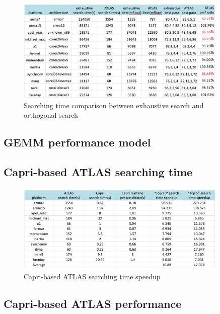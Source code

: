   \begin{figure}[tbhp]
    \centering
    \includegraphics[width=0.9\textwidth]{images/exhaustiveVsorthogonal.png}
    \caption{Searching time comparison between exhaustive search and \atl orthogonal search}
    \label{fig:exhaustiveVsorthogonal}
  \end{figure}

  \subsection{GEMM performance model}
  \label{sec:GEMMperf}

  \subsection{Capri-based ATLAS searching time}
  \label{sec:capri_atlas_searching}

  \begin{figure}[tbhp]
    \centering
    \includegraphics[width=0.9\textwidth]{images/timespeedup.png}
    \caption{Capri-based ATLAS searching time speedup}
    \label{fig:platforms}
  \end{figure}

  \subsection{Capri-based ATLAS performance}
  \label{sec:capri_atlas_performance}

